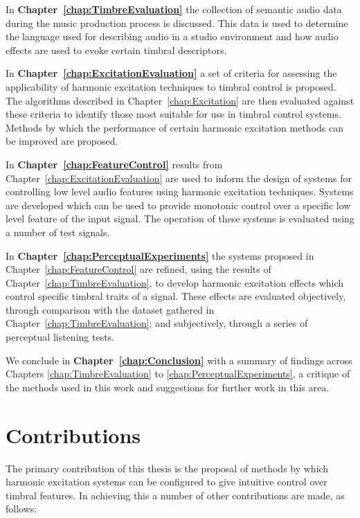 	In {\bf{Chapter~\ref{chap:TimbreEvaluation}}} the collection of semantic audio data during the music production
	process is discussed. This data is used to determine the language used for describing audio in a studio environment
	and how audio effects are used to evoke certain timbral descriptors.

	In {\bf{Chapter~\ref{chap:ExcitationEvaluation}}} a set of criteria for assessing the applicability of harmonic
	excitation techniques to timbral control is proposed. The algorithms described in Chapter~\ref{chap:Excitation} are
	then evaluated against these criteria to identify those most suitable for use in timbral control systems.  Methods
	by which the performance of certain harmonic excitation methods can be improved are proposed.

	In {\bf{Chapter~\ref{chap:FeatureControl}}} results from Chapter~\ref{chap:ExcitationEvaluation} are used to inform
	the design of systems for controlling low level audio features using harmonic excitation techniques. Systems are
	developed which can be used to provide monotonic control over a specific low level feature of the input signal. The
	operation of these systems is evaluated using a number of test signals.

	In {\bf{Chapter~\ref{chap:PerceptualExperiments}}} the systems proposed in Chapter~\ref{chap:FeatureControl} are
	refined, using the results of Chapter~\ref{chap:TimbreEvaluation}, to develop harmonic excitation effects which
	control specific timbral traits of a signal. These effects are evaluated objectively, through comparison with the
	dataset gathered in Chapter~\ref{chap:TimbreEvaluation}; and subjectively, through a series of perceptual listening
	tests.

	We conclude in {\bf{Chapter~\ref{chap:Conclusion}}} with a summary of findings across Chapters
	\ref{chap:TimbreEvaluation} to \ref{chap:PerceptualExperiments}, a critique of the methods used in this work and
	suggestions for further work in this area.

\section{Contributions}
\label{sec:Introduction-Contributions}
	The primary contribution of this thesis is the proposal of methods by which harmonic excitation systems can be
	configured to give intuitive control over timbral features. In achieving this a number of other contributions are
	made, as follows:


